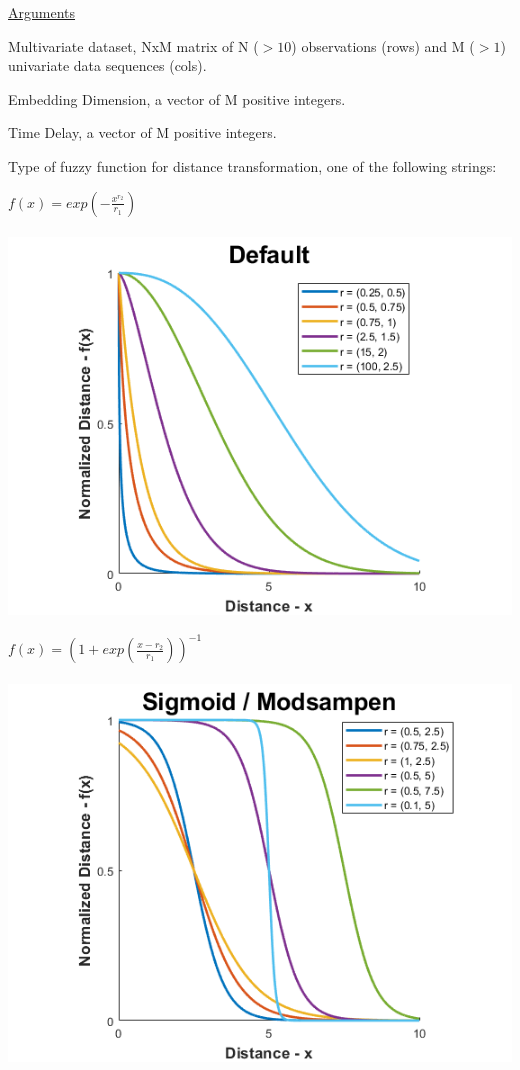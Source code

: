 \documentclass[12pt, a4paper, titlepage, openany]{book}
\begin{document}
\noindent \ul{Arguments}
\begin{description}[labelsep=1cm, labelwidth=2cm, nosep,,style=multiline,leftmargin=3cm]\footnotesize
\item[\texttt{Data}]	Multivariate dataset, NxM matrix of N ($>10$) observations (rows) and M ($> 1$) univariate data sequences (cols).
\item[\texttt{m}]		Embedding Dimension, a vector of M positive integers.
\item[\texttt{tau}]		Time Delay, a vector of M positive integers. 
\item[\texttt{Fx}]		Type of fuzzy function for distance transformation, one of the following strings:
	\begin{description}[labelsep=14em, labelwidth=10em, nosep,style=multiline,leftmargin=6cm]
	\item[\texttt{"default"}]	$f(x) = exp(-\frac{x^{r_2}}{r_1})$\\ \ \\
		\includegraphics[scale=.5]{Fuzz1v1.png} \\
		 
	\item[\texttt{"sigmoid"/"modsampen"}]	$f(x) = (1+exp(\frac{x-r_2}{r_1}))^{-1}$\\ \ \\
		\includegraphics[scale=.5]{Fuzz2v1.png} \\


\end{description}
\end{description}
\end{document}
